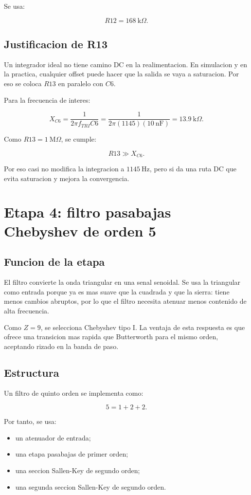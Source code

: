 ﻿\documentclass[11pt,letterpaper]{article}
\newcommand{\kohm}{\text{k}\Omega}
\newcommand{\Mohm}{\text{M}\Omega}
\begin{document}
Se usa:

\[
\boxed{R12=168~\kohm}.
\]

\subsection{Justificacion de R13}

Un integrador ideal no tiene camino DC en la realimentacion. En simulacion y
en la practica, cualquier offset puede hacer que la salida se vaya a
saturacion. Por eso se coloca \(R13\) en paralelo con \(C6\).

Para la frecuencia de interes:

\[
X_{C6}=\frac{1}{2\pi f_{TRI}C6}
=\frac{1}{2\pi(1145)(10~\text{nF})}
=13.9~\kohm.
\]

Como \(R13=1~\Mohm\), se cumple:

\[
R13 \gg X_{C6}.
\]

Por eso casi no modifica la integracion a \(1145~\text{Hz}\), pero si da una
ruta DC que evita saturacion y mejora la convergencia.

\section{Etapa 4: filtro pasabajas Chebyshev de orden 5}

\subsection{Funcion de la etapa}

El filtro convierte la onda triangular en una senal senoidal. Se usa la
triangular como entrada porque ya es mas suave que la cuadrada y que la
sierra: tiene menos cambios abruptos, por lo que el filtro necesita atenuar
menos contenido de alta frecuencia.

Como \(Z=9\), se selecciona Chebyshev tipo I. La ventaja de esta respuesta es
que ofrece una transicion mas rapida que Butterworth para el mismo orden,
aceptando rizado en la banda de paso.

\subsection{Estructura}

Un filtro de quinto orden se implementa como:

\[
5=1+2+2.
\]

Por tanto, se usa:

\begin{itemize}
  \item un atenuador de entrada;
  \item una etapa pasabajas de primer orden;
  \item una seccion Sallen-Key de segundo orden;
  \item una segunda seccion Sallen-Key de segundo orden.
\end{itemize}
\end{document}
